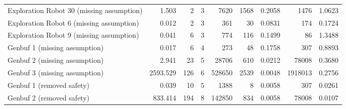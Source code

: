 \begin{tabular}{|l|rr|rr|rr|rr|}
  Exploration Robot 30 (missing assumption) & 1.503 & 2 & 3 & 7620 & 1568 & 0.2058 & 1476 & 1.0623 \\ 
  Exploration Robot 6 (missing assumption) & 0.012 & 2 & 3 & 361 & 30 & 0.0831 & 174 & 0.1724 \\ 
  Exploration Robot 9 (missing assumption) & 0.041 & 6 & 3 & 774 & 116 & 0.1499 & 86 & 1.3488 \\ 
  Genbuf 1 (missing assumption) & 0.017 & 6 & 4 & 273 & 48 & 0.1758 & 307 & 0.8893 \\ 
  Genbuf 2 (missing assumption) & 2.941 & 23 & 5 & 28706 & 610 & 0.0212 & 78008 & 0.3680 \\ 
  Genbuf 3 (missing assumption) & 2593.529 & 126 & 6 & 528650 & 2539 & 0.0048 & 1918013 & 0.2756 \\ 
  Genbuf 1 (removed safety) & 0.039 & 10 & 5 & 1388 & 8 & 0.0058 & 307 & 0.0261 \\ 
  Genbuf 2 (removed safety) & 833.414 & 194 & 8 & 142850 & 834 & 0.0058 & 78008 & 0.0107 \\ 
   \hline
\end{tabular}
